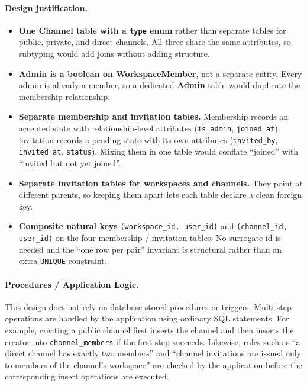 \documentclass[11pt,letterpaper]{article}
\begin{document}
\paragraph{Design justification.}
\begin{itemize}[leftmargin=1.4em,itemsep=2pt]
  \item \textbf{One \textbf{Channel} table with a \texttt{type} enum} rather
        than separate tables for public, private, and direct channels. All
        three share the same attributes, so subtyping would add joins without
        adding structure.
  \item \textbf{Admin is a boolean on \textbf{WorkspaceMember}}, not a
        separate entity. Every admin is already a member, so a dedicated
        \textbf{Admin} table would duplicate the membership relationship.
  \item \textbf{Separate membership and invitation tables.} Membership records
        an accepted state with relationship-level attributes
        (\texttt{is\_admin}, \texttt{joined\_at}); invitation records a
        pending state with its own attributes (\texttt{invited\_by},
        \texttt{invited\_at}, \texttt{status}). Mixing them in one table would
        conflate ``joined'' with ``invited but not yet joined''.
  \item \textbf{Separate invitation tables for workspaces and channels.}
        They point at different parents, so keeping them apart lets each
        table declare a clean foreign key.
  \item \textbf{Composite natural keys} \texttt{(workspace\_id, user\_id)} and
        \texttt{(channel\_id, user\_id)} on the four membership / invitation
        tables. No surrogate id is needed and the ``one row per pair''
        invariant is structural rather than an extra \texttt{UNIQUE}
        constraint.
\end{itemize}

\paragraph{Procedures / Application Logic.}
This design does not rely on database stored procedures or triggers. Multi-step
operations are handled by the application using ordinary SQL statements. For
example, creating a public channel first inserts the channel and then inserts
the creator into \texttt{channel\_members} if the first step succeeds. Likewise,
rules such as ``a direct channel has exactly two members'' and ``channel
invitations are issued only to members of the channel's workspace'' are checked
by the application before the corresponding insert operations are executed.
\end{document}
